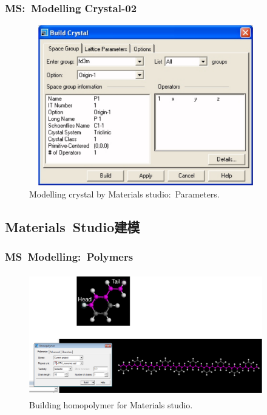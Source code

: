 \frame
{
	\frametitle{\textrm{MS:~Modelling Crystal-02}}
\begin{figure}[h!]
\centering
\vspace*{-0.15in}
\includegraphics[height=2.75in,width=4.00in,viewport=0 0 1090 814,clip]{Figures/MS-New_Project-07.png}
\caption{\tiny \textrm{Modelling crystal by Materials studio:~Parameters.}}%
\label{MS-Modelling-Crystal-02}
\end{figure}
}

\subsection{\rm{Materials~Studio}建模}
\frame
{
	\frametitle{\textrm{MS~Modelling:~Polymers}}
\begin{figure}[h!]
\centering
\vspace*{-0.05in}
\includegraphics[height=2.10in,width=4.00in,viewport=0 0 1280 650,clip]{Figures/MS-Building_homopolymer.png}
\caption{\tiny \textrm{Building homopolymer for Materials studio.}}%
\label{MS-Building_homopolymer}
\end{figure}
}

